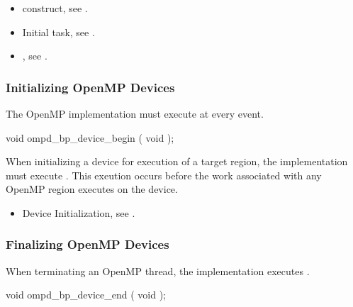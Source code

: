\crossreferences
\begin{itemize}
\item {} construct, see .

\item Initial task, see .

\item {}, 
see .
\end{itemize}



\subsubsection{Initializing OpenMP Devices}
\label{subsubsec:ompd_bp_device_begin}

\summary
The OpenMP implementation must execute  
at every  event.

\format
\begin{cspecific}
\begin{ompSyntax}
void ompd_bp_device_begin ( void );
\end{ompSyntax}
\end{cspecific}

\descr
When initializing a device for execution of a target region, 
the implementation must execute .
This exeution occurs before the work associated with any 
OpenMP region executes on the device.

\crossreferences
\begin{itemize}
\item Device Initialization, see .
\end{itemize}



\subsubsection{Finalizing OpenMP Devices}
\label{subsubsec:ompd_bp_device_end}

\summary
When terminating an OpenMP thread, the implementation 
executes .

\format
\begin{cspecific}
\begin{ompSyntax}
void ompd_bp_device_end ( void );
\end{ompSyntax}
\end{cspecific}

